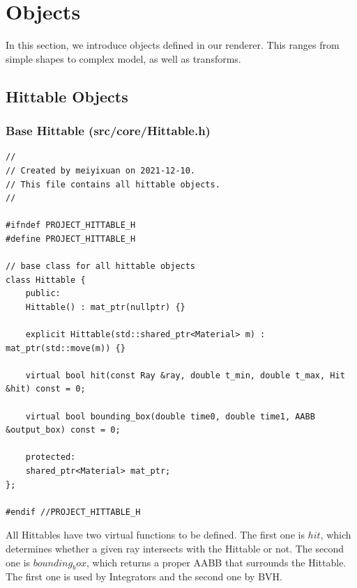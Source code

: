 \documentclass[utf8]{article}
\begin{document}
\section{Objects}
In this section, we introduce objects defined in our renderer. This ranges from simple shapes to complex model, as well as transforms.

\subsection{Hittable Objects}
\subsubsection{Base Hittable (src/core/Hittable.h)}
\begin{lstlisting}[style=CStyle]
//
// Created by meiyixuan on 2021-12-10.
// This file contains all hittable objects.
//

#ifndef PROJECT_HITTABLE_H
#define PROJECT_HITTABLE_H

// base class for all hittable objects
class Hittable {
	public:
	Hittable() : mat_ptr(nullptr) {}
	
	explicit Hittable(std::shared_ptr<Material> m) : mat_ptr(std::move(m)) {}
	
	virtual bool hit(const Ray &ray, double t_min, double t_max, Hit &hit) const = 0;
	
	virtual bool bounding_box(double time0, double time1, AABB &output_box) const = 0;
	
	protected:
	shared_ptr<Material> mat_ptr;
};

#endif //PROJECT_HITTABLE_H

\end{lstlisting}
All Hittables have two virtual functions to be defined. The first one is $hit$, which determines whether a given ray intersects with the Hittable or not. The second one is $bounding_box$, which returns a proper AABB that surrounds the Hittable. The first one is used by Integrators and the second one by BVH.
\end{document}
